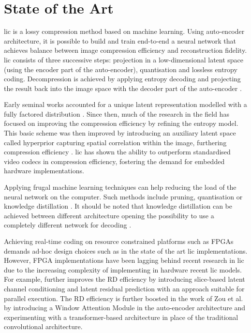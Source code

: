\chapter{State of the Art}
\label{sota}
\acrfull{lic} is a lossy compression method based on machine learning. Using auto-encoder architecture, it is possible to build and train end-to-end a neural network that achieves balance between image compression efficiency and reconstruction fidelity. \acrshort{lic} consists of three successive steps: projection in a low-dimensional latent space (using the encoder part of the auto-encoder), quantisation and lossless entropy coding. Decompression is achieved by applying entropy decoding and projecting the result back into the image space with the decoder part of the auto-encoder \cite{licmedium, licstanford}.

Early seminal works accounted for a unique latent representation modelled with a fully factored distribution \cite{ballé2017endtoendoptimizedimagecompression}. Since then, much of the research in the field has focused on improving the compression efficiency by refining the entropy model. This basic scheme was then improved by introducing an auxiliary latent space called hyperprior capturing spatial correlation within the image, furthering compression efficiency \cite{ballé2018variationalimagecompressionscale}. \acrshort{lic} has shown the ability to outperform standardised video codecs in compression efficiency, fostering the demand for embedded hardware implementations.

Applying frugal machine learning techniques can help reducing the load of the neural network on the computer. Such methods include pruning, quantisation or knowledge distillation \cite{touvron2021trainingdataefficientimagetransformers}. It should be noted that knowledge distillation can be achieved between different architecture opening the possibility to use a completely different network for decoding \cite{liu2022crossarchitectureknowledgedistillation}.

Achieving real-time coding on resource constrained platforms such as FPGAs demands ad-hoc design choices such as in the state of the art \acrshort{lic} implementations. However, FPGA implementations have been lagging behind recent research in \acrshort{lic} due to the increasing complexity of implementing in hardware recent \acrshort{lic} models. For example, further improves the RD efficiency by introducing slice-based latent channel conditioning and latent residual prediction with an approach suitable for parallel execution. The RD efficiency is further boosted in the work of Zou et al. \cite{zou2022devildetailswindowbasedattention} by introducing a Window Attention Module in the auto-encoder architecture and experimenting with a transformer-based architecture in place of the traditional convolutional architecture.
